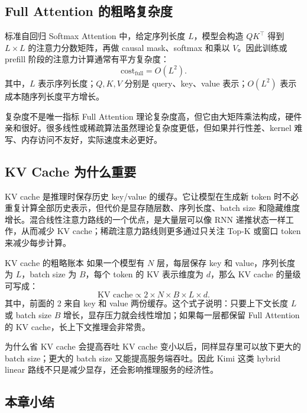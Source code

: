 \documentclass[a4paper]{article}
\begin{document}
\subsection{Full Attention 的粗略复杂度}

标准自回归 Softmax Attention 中，给定序列长度 \(L\)，模型会构造 \(QK^\top\) 得到 \(L \times L\) 的注意力分数矩阵，再做 causal mask、softmax 和乘以 \(V\)。因此训练或 prefill 阶段的注意力计算通常有平方复杂度：
\[
\text{cost}_{\text{full}} = O(L^2).
\]
其中，\(L\) 表示序列长度；\(Q,K,V\) 分别是 query、key、value 表示；\(O(L^2)\) 表示成本随序列长度平方增长。

\begin{warningbox}{复杂度不是唯一指标}
Full Attention 理论复杂度高，但它由大矩阵乘法构成，硬件亲和很好。很多线性或稀疏算法虽然理论复杂度更低，但如果并行性差、kernel 难写、内存访问不友好，实际速度未必更好。
\end{warningbox}

\subsection{KV Cache 为什么重要}

KV cache 是推理时保存历史 key/value 的缓存。它让模型在生成新 token 时不必重复计算全部历史表示，但代价是显存随层数、序列长度、batch size 和隐藏维度增长。混合线性注意力路线的一个优点，是大量层可以像 RNN 递推状态一样工作，从而减少 KV cache；稀疏注意力路线则更多通过只关注 Top-K 或窗口 token 来减少每步计算。

\begin{knowledgebox}{KV cache 的粗略账本}
如果一个模型有 \(N\) 层，每层保存 key 和 value，序列长度为 \(L\)，batch size 为 \(B\)，每个 token 的 KV 表示维度为 \(d\)，那么 KV cache 的量级可写成：
\[
\text{KV cache} \propto 2 \times N \times B \times L \times d.
\]
其中，前面的 2 来自 key 和 value 两份缓存。这个式子说明：只要上下文长度 \(L\) 或 batch size \(B\) 增长，显存压力就会线性增加；如果每一层都保留 Full Attention 的 KV cache，长上下文推理会非常贵。
\end{knowledgebox}

\begin{importantbox}{为什么省 KV cache 会提高吞吐}
KV cache 变小以后，同样显存里可以放下更大的 batch size；更大的 batch size 又能提高服务端吞吐。因此 Kimi 这类 hybrid linear 路线不只是减少显存，还会影响推理服务的经济性。
\end{importantbox}

\subsection{本章小结}
\end{document}
